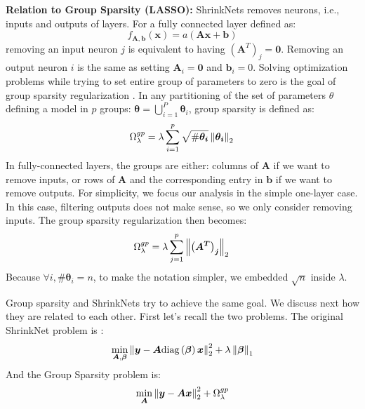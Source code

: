 \noindent\textbf{Relation to Group Sparsity (LASSO): } ShrinkNets removes neurons,
i.e., inputs and outputs of layers. For a fully connected layer defined as:
%
\begin{equation} \label{fully_connected}
  f_{\bm{A}, \bm{b}}(\bm{x})=a(\bm{Ax + b})
\end{equation}
%
removing an input neuron $j$ is equivalent to having $\left(\bm{A}^T\right)_j =
\bm{0}$. Removing an output neuron $i$ is the same as setting $\bm{A}_i = \bm{0}$
and $\bm{b}_i = 0$. Solving optimization problems while trying to set entire
group of parameters to zero is the goal of group sparsity regularization
\cite{XXX}. In  any partitioning of the set of parameters $\theta$ defining a model in $p$
groups: $\bm{\theta} = \bigcup_{i=1}^P \bm{\theta}_i$, group sparsity is defined as: 
%
\begin{equation}
  \Omega_\lambda^{gp} = \lambda \sum_{i=1}^p \sqrt{\#\bm{\theta_i}} \left\lVert\bm{\theta_i}\right\rVert_2 \\
\end{equation}
%
In fully-connected layers, the groups are either: columns of
$\bm{A}$ if we want to remove inputs, or rows of $\bm{A}$ and the corresponding
entry in $\bm{b}$ if we want to remove outputs. For simplicity, we focus
our analysis in the simple one-layer case. In this case, filtering outputs does
not make sense, so we only consider removing inputs. The
group sparsity regularization then becomes:
%
\begin{equation} \label{group_sparsity_regularization}
  \Omega_\lambda^{gp} = \lambda \sum_{j=1}^p \left\lVert\bm{\left(A^T\right)_j}\right\rVert_2 \\
\end{equation}
%
Because $\forall i, \#\bm{\theta}_i = n$, to make the notation simpler, we
embedded $\sqrt{n}$ inside $\lambda$.

Group sparsity and ShrinkNets try to achieve the same goal. We discuss next how
they are related to each other. First let's recall the two problems. The
original ShrinkNet problem is :
%
\begin{equation}
  \min_{\bm{A}, \bm{\beta}} \left\lVert\bm{y} - \bm{A}\text{diag}\left(\bm{\beta}\right)\bm{x}\right\rVert_2^2 + \lambda \left\lVert\bm{\beta}\right\rVert_1
\end{equation}
%
And the Group Sparsity problem is:
%
\begin{equation}
  \min_{\bm{A}} \left\lVert\bm{y} - \bm{A}\bm{x}\right\rVert_2^2 + \Omega_\lambda^{gp}
\end{equation}
%

